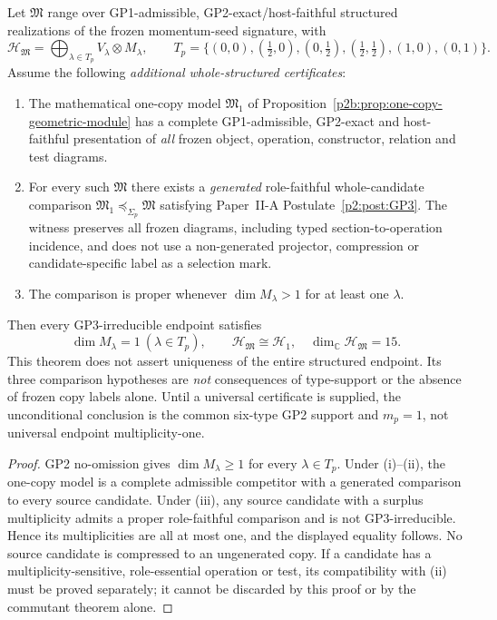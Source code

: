 \documentclass[12pt,a4paper]{article}
\begin{document}
\begin{theorem}
\label{p2b:thm:momentum-carrier-rigidity}
Let \(\mathfrak M\) range over GP1-admissible, GP2-exact/host-faithful
structured realizations of the frozen momentum-seed signature, with
\[
 \mathcal H_{\mathfrak M}=\bigoplus_{\lambda\in T_p}
 V_\lambda\otimes M_\lambda,
 \qquad T_p=\{(0,0),(\tfrac12,0),(0,\tfrac12),
 (\tfrac12,\tfrac12),(1,0),(0,1)\}.
\]
Assume the following \emph{additional whole-structured certificates}:
\begin{enumerate}[label=(\roman*),leftmargin=2em]
\item The mathematical one-copy model
\(\mathfrak M_1\) of
Proposition~\ref{p2b:prop:one-copy-geometric-module} has a
complete GP1-admissible, GP2-exact and host-faithful presentation of
\emph{all} frozen object, operation, constructor, relation and test diagrams.
\item For every such \(\mathfrak M\) there exists a \emph{generated}
role-faithful whole-candidate comparison
\(\mathfrak M_1\preceq_{\Sigma_p}\mathfrak M\) satisfying
Paper~II-A Postulate~\ref{p2:post:GP3}.  The witness preserves all
frozen diagrams, including typed section-to-operation incidence,
and does not use a non-generated projector, compression or
candidate-specific label as a selection mark.
\item The comparison is proper whenever
\(\dim M_\lambda>1\) for at least one \(\lambda\).
\end{enumerate}
Then every GP3-irreducible endpoint satisfies
\[
 \boxed{\dim M_\lambda=1\ (\lambda\in T_p),\qquad
 \mathcal H_{\mathfrak M}\cong\mathcal H_1,\quad
 \dim_{\mathbb C}\mathcal H_{\mathfrak M}=15.}
\]
This theorem does not assert uniqueness of the entire structured endpoint.
Its three comparison hypotheses are \emph{not} consequences of type-support
or the absence of frozen copy labels alone.  Until a universal certificate
is supplied, the unconditional conclusion is the common six-type GP2
support and \(m_p=1\), not universal endpoint multiplicity-one.
\end{theorem}
\begin{proof}
GP2 no-omission gives \(\dim M_\lambda\ge1\) for every
\(\lambda\in T_p\).  Under (i)--(ii), the one-copy model is a complete
admissible competitor with a generated comparison to every source candidate.
Under (iii), any source candidate with a surplus multiplicity admits a
proper role-faithful comparison and is not GP3-irreducible.  Hence its
multiplicities are all at most one, and the displayed equality follows.
No source candidate is compressed to an ungenerated copy.  If a candidate
has a multiplicity-sensitive, role-essential operation or test, its
compatibility with (ii) must be proved separately; it cannot be discarded
by this proof or by the commutant theorem alone.
\end{proof}
\end{document}
